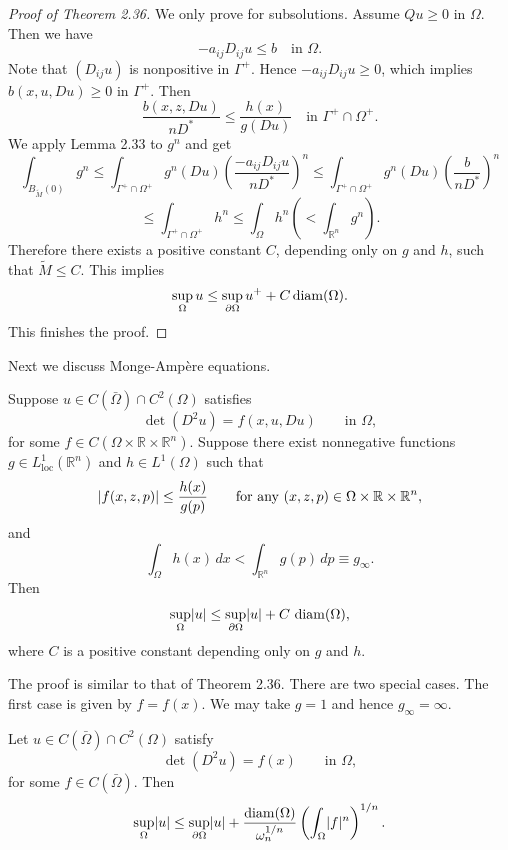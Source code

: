 \begin{proof}[Proof of Theorem 2.36]
\sketch
We only prove for subsolutions. Assume $Qu \ge 0$
in $\Omega$. Then we have
\[
-a_{ij}D_{ij}u \le b \quad \text{in } \Omega.
\]
Note that $(D_{ij}u)$ is nonpositive in $\Gamma^+$. Hence $-a_{ij}D_{ij}u \ge 0$,
which implies $b(x,u,Du) \ge 0$ in $\Gamma^+$. Then
\[
\frac{b(x,z,Du)}{nD^*} \le \frac{h(x)}{g(Du)}
\quad \text{in } \Gamma^+ \cap \Omega^+.
\]
We apply Lemma 2.33 to $g^n$ and get
\[
\int_{B_{\tilde M}(0)} g^n \le
\int_{\Gamma^+\cap\Omega^+} g^n(Du)\left(\frac{-a_{ij}D_{ij}u}{nD^*}\right)^n
\le \int_{\Gamma^+\cap\Omega^+} g^n(Du)\left(\frac{b}{nD^*}\right)^n
\]
\[
\le \int_{\Gamma^+\cap\Omega^+} h^n \le \int_{\Omega} h^n \left(< \int_{\mathbb{R}^n} g^n\right).
\]
Therefore there exists a positive constant $C$, depending only on $g$ and $h$, such
that $\tilde M \le C$. This implies
\[
\sup_{\Omega} u \le \sup_{\partial \Omega} u^+ + C \operatorname{diam}(\Omega).
\]
This finishes the proof.
\end{proof}


Next we discuss Monge-Ampère equations.

\begin{theorem}\label{hanlin:maxprin-theorem-2-39}
Suppose $u \in C(\bar{\Omega}) \cap C^2(\Omega)$ satisfies
\[
\det(D^2u)=f(x,u,Du)\qquad \text{in }\Omega,
\]
for some $f \in C(\Omega\times\mathbb{R}\times\mathbb{R}^n)$. Suppose there exist nonnegative functions $g \in L^1_{\mathrm{loc}}(\mathbb{R}^n)$ and $h \in L^1(\Omega)$ such that
\[
\lvert f(x,z,p)\rvert \le \frac{h(x)}{g(p)} \qquad \text{for any } (x,z,p) \in \Omega \times \mathbb{R} \times \mathbb{R}^n,
\]
and
\[
\int_{\Omega} h(x)\,dx < \int_{\mathbb{R}^n} g(p)\,dp \equiv g_\infty.
\]
Then
\[
\sup_{\Omega}\lvert u\rvert \le \sup_{\partial\Omega}\lvert u\rvert + C\,\operatorname{diam}(\Omega),
\]
where $C$ is a positive constant depending only on $g$ and $h$.
\end{theorem}

The proof is similar to that of Theorem 2.36. There are two special cases. The first case is given by $f=f(x)$. We may take $g=1$ and hence $g_\infty=\infty$.

\begin{corollary}\label{hanlin:maxprin-cor-2-40}
Let $u \in C(\bar{\Omega}) \cap C^2(\Omega)$ satisfy
\[
\det(D^2u)=f(x)\qquad \text{in }\Omega,
\]
for some $f \in C(\bar{\Omega})$. Then
\[
\sup_{\Omega}\lvert u\rvert \le \sup_{\partial\Omega}\lvert u\rvert + \frac{\operatorname{diam}(\Omega)}{\omega_n^{1/n}}\left(\int_{\Omega} \lvert f\rvert^n\right)^{1/n}.
\]
\end{corollary}

